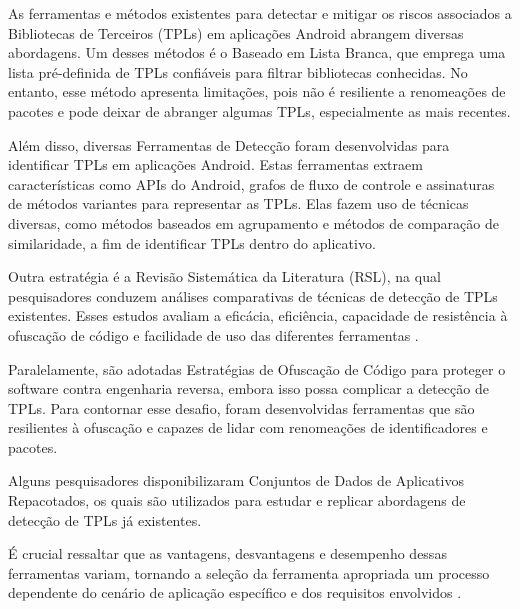 
As ferramentas e métodos existentes para detectar e mitigar os riscos associados a Bibliotecas de Terceiros (TPLs) em aplicações Android abrangem diversas abordagens. Um desses métodos é o Baseado em Lista Branca, que emprega uma lista pré-definida de TPLs confiáveis para filtrar bibliotecas conhecidas. No entanto, esse método apresenta limitações, pois não é resiliente a renomeações de pacotes e pode deixar de abranger algumas TPLs, especialmente as mais recentes.

Além disso, diversas Ferramentas de Detecção foram desenvolvidas para identificar TPLs em aplicações Android. Estas ferramentas extraem características como APIs do Android, grafos de fluxo de controle e assinaturas de métodos variantes para representar as TPLs. Elas fazem uso de técnicas diversas, como métodos baseados em agrupamento e métodos de comparação de similaridade, a fim de identificar TPLs dentro do aplicativo.

Outra estratégia é a Revisão Sistemática da Literatura (RSL), na qual pesquisadores conduzem análises comparativas de técnicas de detecção de TPLs existentes. Esses estudos avaliam a eficácia, eficiência, capacidade de resistência à ofuscação de código e facilidade de uso das diferentes ferramentas \cite{api_tpl_zhang}.

Paralelamente, são adotadas Estratégias de Ofuscação de Código para proteger o software contra engenharia reversa, embora isso possa complicar a detecção de TPLs. Para contornar esse desafio, foram desenvolvidas ferramentas que são resilientes à ofuscação e capazes de lidar com renomeações de identificadores e pacotes.

Alguns pesquisadores disponibilizaram Conjuntos de Dados de Aplicativos Repacotados, os quais são utilizados para estudar e replicar abordagens de detecção de TPLs já existentes.

É crucial ressaltar que as vantagens, desvantagens e desempenho dessas ferramentas variam, tornando a seleção da ferramenta apropriada um processo dependente do cenário de aplicação específico e dos requisitos envolvidos \cite{api_tpl_zhang}.



